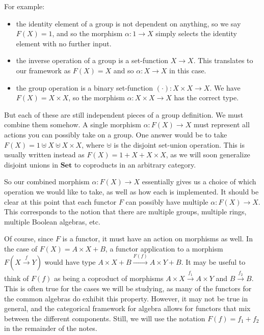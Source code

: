 \documentclass{article}
\theoremstyle{plain}
\theoremstyle{definition}
\begin{document}
For example: \begin{itemize}
\item the identity element of a group is not dependent on anything, so we say \ensuremath{F\left( X \right) = 1}, and so the morphism \ensuremath{\alpha : 1 \rightarrow X} simply selects the identity element with no further input.
\item the inverse operation of a group is a set-function \ensuremath{X \rightarrow X}. This translates to our framework as \ensuremath{F\left( X \right) = X} and so \ensuremath{\alpha : X \rightarrow X} in this case.
\item the group operation is a binary set-function \ensuremath{\left( \cdot \right) : X \times X \rightarrow X}. We have \ensuremath{F\left( X \right) = X \times X}, so the morphism \ensuremath{\alpha : X \times X \rightarrow X} has the correct type.
\end{itemize}


But each of these are still independent pieces of a group definition. We must combine them somehow. A single morphism \ensuremath{\alpha : F\left( X \right) \rightarrow X} must represent all actions you can possibly take on a group. One answer would be to take \ensuremath{F\left( X \right) = 1 \uplus X \uplus X \times X}, where \ensuremath{\uplus} is the disjoint set-union operation. This is usually written instead as \ensuremath{F\left( X \right) = 1 + X + X \times X}, as we will soon generalize disjoint unions in \ensuremath{\mathbf{Set}} to coproducts in an arbitrary category.

So our combined morphism \ensuremath{\alpha : F\left( X \right) \rightarrow X} essentially gives us a choice of which operation we would like to take, as well as how each is implemented. It should be clear at this point that each functor \ensuremath{F} can possibly have multiple \ensuremath{\alpha : F\left( X \right) \rightarrow X}. This corresponds to the notion that there are multiple groups, multiple rings, multiple Boolean algebras, etc.

Of course, since \ensuremath{F} is a functor, it must have an action on morphisms as well. In the case of \ensuremath{F\left( X \right) = A \times X + B}, a functor application to a morphism \ensuremath{F\left( X \xrightarrow{f} Y \right)} would have type \ensuremath{A \times X + B \xrightarrow{F\left( f \right)} A \times Y + B}. It may be useful to think of \ensuremath{F\left( f \right)} as being a coproduct of morphisms \ensuremath{A \times X \xrightarrow{{f}_{1}} A \times Y} and \ensuremath{B \xrightarrow{{f}_{2}} B}. This is often true for the cases we will be studying, as many of the functors for the common algebras do exhibit this property. However, it may not be true in general, and the categorical framework for algebra allows for functors that mix between the different components. Still, we will use the notation \ensuremath{F\left( f \right) = {f}_{1} + {f}_{2}} in the remainder of the notes.
\end{document}
